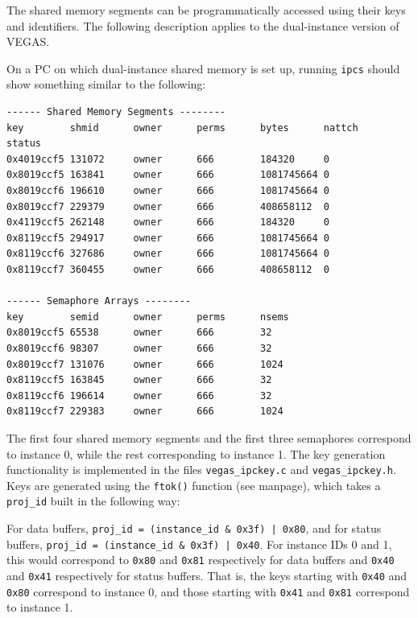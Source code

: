 \documentclass[11pt]{article} %
\begin{document}
The shared memory segments can be programmatically accessed using their keys
and identifiers. The following description applies to the dual-instance version
of VEGAS.

On a PC on which dual-instance shared memory is set up, running {\tt ipcs}
should show something similar to the following:

\begin{verbatim}
------ Shared Memory Segments --------
key        shmid      owner      perms      bytes      nattch     status      
0x4019ccf5 131072     owner      666        184320     0                       
0x8019ccf5 163841     owner      666        1081745664 0                       
0x8019ccf6 196610     owner      666        1081745664 0                       
0x8019ccf7 229379     owner      666        408658112  0                       
0x4119ccf5 262148     owner      666        184320     0                       
0x8119ccf5 294917     owner      666        1081745664 0                       
0x8119ccf6 327686     owner      666        1081745664 0                       
0x8119ccf7 360455     owner      666        408658112  0                       

------ Semaphore Arrays --------
key        semid      owner      perms      nsems     
0x8019ccf5 65538      owner      666        32        
0x8019ccf6 98307      owner      666        32        
0x8019ccf7 131076     owner      666        1024      
0x8119ccf5 163845     owner      666        32        
0x8119ccf6 196614     owner      666        32        
0x8119ccf7 229383     owner      666        1024      
\end{verbatim}

The first four shared memory segments and the first three semaphores correspond
to instance 0, while the rest corresponding to instance 1. The key generation
functionality is implemented in the files {\tt vegas\_ipckey.c} and
{\tt vegas\_ipckey.h}. Keys are generated using the {\tt ftok()} function (see
manpage), which takes a {\tt proj\_id} built in the following way:

For data buffers, {\tt proj\_id = (instance\_id \& 0x3f) | 0x80}, and for
status buffers, {\tt proj\_id = (instance\_id \& 0x3f) | 0x40}. For instance
IDs 0 and 1, this would correspond to {\tt 0x80} and {\tt 0x81} respectively
for data buffers and {\tt 0x40} and {\tt 0x41} respectively for status buffers.
That is, the keys starting with {\tt 0x40} and {\tt 0x80} correspond to
instance 0, and those starting with {\tt 0x41} and {\tt 0x81} correspond to
instance 1.
\end{document}
